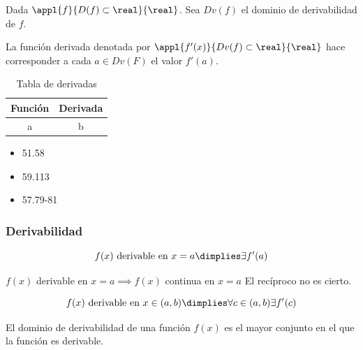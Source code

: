 \begin{defn}
Dada $\appl{f}{D(f)\subset\real}{\real}$. Sea $Dv(f)$ el dominio de derivabilidad de $f$.

La función derivada denotada por $\appl{f'(x)}{Dv(f)\subset\real}{\real}$ hace corresponder a cada $a\in Dv(F)$ el valor $f'(a)$.
\end{defn}

\begin{table}[hbp]
\centering
\begin{tabular}{|c|c|}\hline
Función & Derivada\\
\hline
a&b\\\hline
\end{tabular}
\caption{Tabla de derivadas}
\label{tbl::Derivadas}
\end{table}

\begin{problem}

\begin{itemize}
	\item 51.58
	\item 59.113
	\item 57.79-81
\end{itemize}

\solution
\end{problem}

\subsubsection{Derivabilidad}
\begin{defn}
\[f(x) \text{ derivable en } x=a\dimplies \exists f'(a)\]
\end{defn}

\begin{prop}
$f(x)$ derivable en $x=a \implies f(x)$ continua en $x=a$
\obs El recíproco no es cierto.
\end{prop}

\begin{defn}
\[f(x) \text{ derivable en } x\in(a,b) \dimplies \forall c\in(a,b) \exists f'(c) \]
\end{defn}

\begin{defn}
El dominio de derivabilidad de una función $f(x)$ es el mayor conjunto en el que la función es derivable.
\end{defn}

